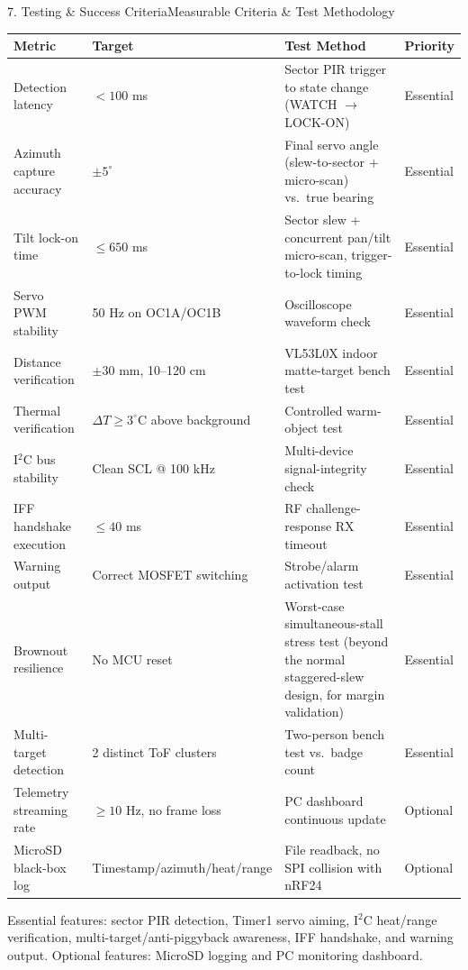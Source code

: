 \documentclass[aspectratio=169, 10pt]{beamer}
\begin{document}
\begin{frame}{7. Testing \& Success Criteria}{Measurable Criteria \& Test Methodology}
    \tiny
    \renewcommand{\arraystretch}{0.88}
    \begin{table}
        \centering
        \begin{tabular}{p{2.5cm} p{2.5cm} p{5.5cm} p{1.1cm}}
            \toprule
            \textbf{\color{Accent} Metric} & \textbf{\color{Accent} Target} & \textbf{\color{Accent} Test Method} & \textbf{\color{Accent} Priority} \\
            \midrule
            Detection latency & $< 100$ ms & Sector PIR trigger to state change (WATCH $\rightarrow$ LOCK-ON) & Essential \\
            Azimuth capture accuracy & $\pm 5^\circ$ & Final servo angle (slew-to-sector + micro-scan) vs.\ true bearing & Essential \\
            Tilt lock-on time & $\le 650$ ms & Sector slew + concurrent pan/tilt micro-scan, trigger-to-lock timing & Essential \\
            Servo PWM stability & 50 Hz on OC1A/OC1B & Oscilloscope waveform check & Essential \\
            Distance verification & $\pm 30$ mm, 10--120 cm & VL53L0X indoor matte-target bench test & Essential \\
            Thermal verification & $\Delta T \ge 3^\circ$C above background & Controlled warm-object test & Essential \\
            I$^2$C bus stability & Clean SCL @ 100 kHz & Multi-device signal-integrity check & Essential \\
            IFF handshake execution & $\le 40$ ms & RF challenge-response RX timeout & Essential \\
            Warning output & Correct MOSFET switching & Strobe/alarm activation test & Essential \\
            Brownout resilience & No MCU reset & Worst-case simultaneous-stall stress test (beyond the normal staggered-slew design, for margin validation) & Essential \\
            Multi-target detection & 2 distinct ToF clusters & Two-person bench test vs.\ badge count & Essential \\
            Telemetry streaming rate & $\ge 10$ Hz, no frame loss & PC dashboard continuous update & Optional \\
            MicroSD black-box log & Timestamp/azimuth/heat/range & File readback, no SPI collision with nRF24 & Optional \\
            \bottomrule
        \end{tabular}
    \end{table}
    \vspace{0.15cm}
    \footnotesize\color{Dim} Essential features: sector PIR detection, Timer1 servo aiming, I$^2$C heat/range verification, multi-target/anti-piggyback awareness, IFF handshake, and warning output. Optional features: MicroSD logging and PC monitoring dashboard.
\end{frame}
\end{document}

